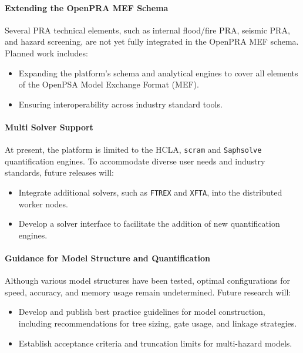 \paragraph{Extending the OpenPRA MEF Schema}

Several PRA technical elements, such as internal flood/fire PRA, seismic PRA, and hazard screening, are not yet fully integrated in the OpenPRA MEF schema. Planned work includes:
\begin{itemize}
    \item Expanding the platform’s schema and analytical engines to cover all elements of the OpenPSA Model Exchange Format (MEF).
    \item Ensuring interoperability across industry standard tools.
\end{itemize}

\paragraph{Multi Solver Support}

At present, the platform is limited to the HCLA, \texttt{scram} and \texttt{Saphsolve} quantification engines. To accommodate diverse user needs and industry standards, future releases will:
\begin{itemize}
    \item Integrate additional solvers, such as \texttt{FTREX} and \texttt{XFTA}, into the distributed worker nodes.
    \item Develop a solver interface to facilitate the addition of new quantification engines.
\end{itemize}

\paragraph{Guidance for Model Structure and Quantification}

Although various model structures have been tested, optimal configurations for speed, accuracy, and memory usage remain undetermined. Future research will:
\begin{itemize}
    \item Develop and publish best practice guidelines for model construction, including recommendations for tree sizing, gate usage, and linkage strategies.
    \item Establish acceptance criteria and truncation limits for multi-hazard models.
\end{itemize}

